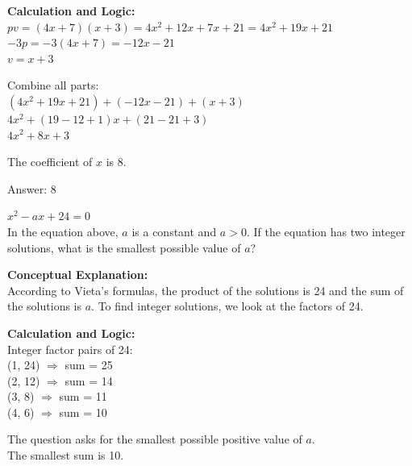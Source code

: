 \documentclass[11pt,paper=a4,answers]{exam}
\begin{document}
\begin{questions}
\begin{solution}
\vspace{20pt}

\textbf{Calculation and Logic:} \\
$pv = (4x + 7)(x + 3) = 4x^2 + 12x + 7x + 21 = 4x^2 + 19x + 21$ \\
$-3p = -3(4x + 7) = -12x - 21$ \\
$v = x + 3$

\vspace{10pt}

Combine all parts: \\
$(4x^2 + 19x + 21) + (-12x - 21) + (x + 3)$ \\
$4x^2 + (19 - 12 + 1)x + (21 - 21 + 3)$ \\
$4x^2 + 8x + 3$

\vspace{10pt}

The coefficient of $x$ is 8.

\vspace{25pt}

Answer: \colorbox{yellow!100}{8}
\end{solution}

\question
$x^2 - ax + 24 = 0$ \\
In the equation above, $a$ is a constant and $a > 0$. If the equation has two integer solutions, what is the smallest possible value of $a$?

\begin{solution}
\textbf{Conceptual Explanation:} \\
According to Vieta's formulas, the product of the solutions is 24 and the sum of the solutions is $a$. To find integer solutions, we look at the factors of 24.

\vspace{20pt}

\textbf{Calculation and Logic:} \\
Integer factor pairs of 24: \\
(1, 24) $\Rightarrow$ sum = 25 \\
(2, 12) $\Rightarrow$ sum = 14 \\
(3, 8) $\Rightarrow$ sum = 11 \\
(4, 6) $\Rightarrow$ sum = 10

\vspace{10pt}

The question asks for the smallest possible positive value of $a$. \\
The smallest sum is 10.


\end{solution}
\end{questions}
\end{document}
